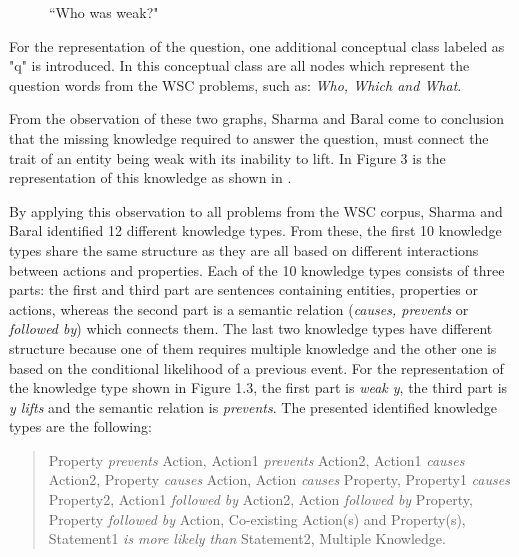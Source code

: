 \begin{figure}
	\centering
	
	\caption{\label{Graph12}``Who was weak?"}
\end{figure}

For the representation of the question, one additional conceptual class labeled as "q" is introduced. In this conceptual class are all nodes which represent the question words from the WSC problems, such as: \textit{Who, Which and What}.

From the observation of these two graphs, Sharma and Baral \cite{2018CommonsenseKT} come to conclusion that the missing knowledge required to answer the question, must connect the trait of an entity being weak with its inability to lift. In Figure 3 is the representation of this knowledge as shown in \cite{2018CommonsenseKT}. 

\begin{comment}
	content...

\begin{figure}
	\centering
	
	\caption{\label{Graph13}``Prevents type?"}
\end{figure}
\end{comment}

By applying this observation to all problems from the WSC corpus, Sharma and Baral \cite{2018CommonsenseKT} identified 12 different knowledge types. From these, the first 10 knowledge types share the same structure as they are all based on different interactions between actions and properties. Each of the 10 knowledge types consists of three parts: the first and third part are sentences containing entities, properties or actions, whereas the second part is a semantic relation (\textit{causes, prevents} or \textit{followed by}) which connects them. The last two knowledge types have different structure because one of them requires multiple knowledge and the other one is based on the conditional likelihood of a previous event. 
For the representation of the knowledge type shown in Figure 1.3, the first part is \textit{weak y}, the third part is \textit{y lifts} and the semantic relation is \textit{prevents}.
The presented identified knowledge types are the following:

\begin{quote} 
	Property \textit{prevents} Action, Action1 \textit{prevents} Action2, Action1 \textit{causes} Action2, Property \textit{causes} Action, Action \textit{causes} Property, Property1 \textit{causes} Property2, Action1 \textit{followed by} Action2, Action \textit{followed by} Property, Property \textit{followed by} Action, Co-existing Action(s) and Property(s), Statement1 \textit{is more likely than} Statement2, Multiple Knowledge. 
\end{quote}



